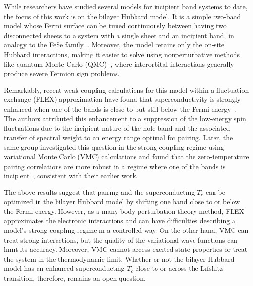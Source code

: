 \documentclass[prb,twocolumn,amsmath,amssymb,superscriptaddress,floatfix,nofootinbib]{revtex4-2}
\begin{document}
While researchers have studied several models for incipient band systems to date, the focus of this work is on the bilayer Hubbard model. It is a simple two-band model whose Fermi surface can be tuned continuously between having two disconnected sheets to a system with a single sheet and an incipient band, in analogy to the FeSe family~\cite{Maier2011}. Moreover, the model retains only the on-site Hubbard interactions, making it easier to solve using nonperturbative methods like quantum Monte Carlo (QMC)~\cite{Maier2011, Maier2019, PelliciariRIXS2020, KurokiVMC2020},  where interorbital interactions generally produce severe Fermion sign problems.

Remarkably, recent weak coupling calculations for this model within a fluctuation exchange (FLEX) approximation have found that superconductivity is strongly enhanced when one of the bands is close to but still below the Fermi energy~\cite{KurokiFlex2020}. The authors attributed this enhancement to a suppression of the low-energy spin fluctuations due to the incipient nature of the hole band and the associated transfer of spectral weight to an energy range optimal for pairing. Later, the same group investigated this question in the strong-coupling regime using variational Monte Carlo (VMC) calculations and found that the zero-temperature pairing correlations are more robust in a regime where one of the bands is incipient~\cite{KurokiVMC2020}, consistent with their earlier work. 

The above results suggest that pairing and the superconducting $T_c$ can be optimized in the bilayer Hubbard model by shifting one band close to or below the Fermi energy. However, as a many-body perturbation theory method, FLEX approximates the electronic interactions and can have difficulties describing a model's strong coupling regime in a controlled way. On the other hand, VMC can treat strong interactions, but the quality of the variational wave functions can limit its accuracy. Moreover, VMC cannot access excited state properties or treat the system in the thermodynamic limit. Whether or not the bilayer Hubbard model has an enhanced superconducting $T_c$ close to or across the Lifshitz transition, therefore, remains an open question. 
\end{document}
